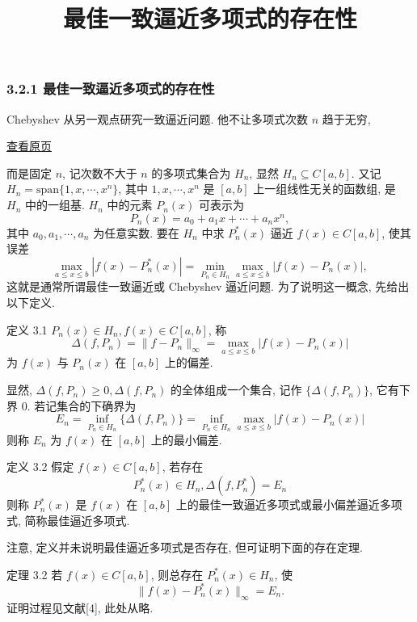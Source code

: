 \documentclass[
  10pt,
  fontset=fandol]{ctexart}
\title{最佳一致逼近多项式的存在性}
\author{}
\date{}
\begin{document}
\maketitle

\subsubsection{3.2.1 最佳一致逼近多项式的存在性}\label{ux6700ux4f73ux4e00ux81f4ux903cux8fd1ux591aux9879ux5f0fux7684ux5b58ux5728ux6027}

Chebyshev 从另一观点研究一致逼近问题. 他不让多项式次数 \(n\) 趋于无穷,

\href{../../source-images/pdf-061.jpeg}{查看原页}

而是固定 \(n\), 记次数不大于 \(n\) 的多项式集合为 \(H_n\), 显然 \(H_n \subseteq C[a,b]\). 又记 \(H_n = \text{span}\{1,x,\cdots,x^n\}\), 其中 \(1,x,\cdots,x^n\) 是 \([a,b]\) 上一组线性无关的函数组, 是 \(H_n\) 中的一组基. \(H_n\) 中的元素 \(P_n(x)\) 可表示为 \[
P_n(x) = a_0 + a_1x + \cdots + a_nx^n,
\] 其中 \(a_0,a_1,\cdots,a_n\) 为任意实数. 要在 \(H_n\) 中求 \(P_n^*(x)\) 逼近 \(f(x) \in C[a,b]\), 使其误差 \[
\max_{a \leqslant x \leqslant b} |f(x) - P_n^*(x)| = \min_{P_n \in H_n} \max_{a \leqslant x \leqslant b} |f(x) - P_n(x)|,
\] 这就是通常所谓最佳一致逼近或 Chebyshev 逼近问题. 为了说明这一概念, 先给出以下定义.

定义 3.1 \(P_n(x) \in H_n, f(x) \in C[a,b]\), 称 \[
\Delta(f,P_n) = \|f - P_n\|_\infty = \max_{a \leqslant x \leqslant b} |f(x) - P_n(x)| \tag{3.2.1}
\] 为 \(f(x)\) 与 \(P_n(x)\) 在 \([a,b]\) 上的偏差.

显然, \(\Delta(f,P_n) \geqslant 0, \Delta(f,P_n)\) 的全体组成一个集合, 记作 \(\{\Delta(f,P_n)\}\), 它有下界 0. 若记集合的下确界为 \[
E_n = \inf_{P_n \in H_n} \{\Delta(f,P_n)\} = \inf_{P_n \in H_n} \max_{a \leqslant x \leqslant b} |f(x) - P_n(x)| \tag{3.2.2}
\] 则称 \(E_n\) 为 \(f(x)\) 在 \([a,b]\) 上的最小偏差.

定义 3.2 假定 \(f(x) \in C[a,b]\), 若存在 \[
P_n^*(x) \in H_n, \Delta(f,P_n^*) = E_n \tag{3.2.3}
\] 则称 \(P_n^*(x)\) 是 \(f(x)\) 在 \([a,b]\) 上的最佳一致逼近多项式或最小偏差逼近多项式, 简称最佳逼近多项式.

注意, 定义并未说明最佳逼近多项式是否存在, 但可证明下面的存在定理.

定理 3.2 若 \(f(x) \in C[a,b]\), 则总存在 \(P_n^*(x) \in H_n\), 使 \[
\|f(x) - P_n^*(x)\|_\infty = E_n.
\] 证明过程见文献{[}4{]}, 此处从略.
\end{document}

